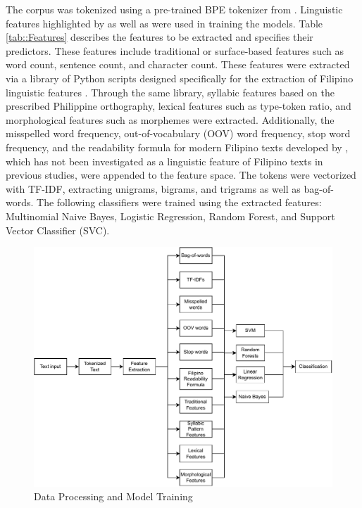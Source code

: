 The corpus was tokenized using a pre-trained BPE tokenizer from . Linguistic features highlighted by  as well as  were used in training the models. Table \ref{tab::Features} describes the features to be extracted and specifies their predictors. These features include traditional or surface-based features such as word count, sentence count, and character count. These features were extracted via a library of Python scripts designed specifically for the extraction of Filipino linguistic features \cite{imperial-2020, imperial-2021}. Through the same library, syllabic features based on the prescribed Philippine orthography, lexical features such as type-token ratio, and morphological features such as morphemes were extracted. Additionally, the misspelled word frequency, out-of-vocabulary (OOV) word frequency, stop word frequency, and the readability formula for modern Filipino texts developed by , which has not been investigated as a linguistic feature of Filipino texts in previous studies, were appended to the feature space. The tokens were vectorized with TF-IDF, extracting unigrams, bigrams, and trigrams as well as bag-of-words. The following classifiers were trained using the extracted features: Multinomial Naive Bayes, Logistic Regression, Random Forest, and Support Vector Classifier (SVC).

\begin{figure}[h]
\includegraphics[width=\textwidth,height=\textheight,keepaspectratio]{figures/Model Training.pdf}
  \caption{Data Processing and Model Training}
  \label{fig:Model}
\end{figure}

